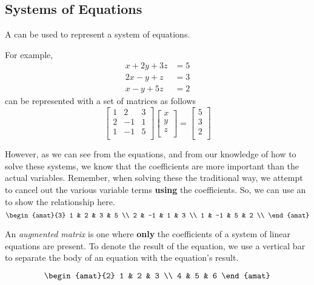 \subsection{Systems of Equations}\label{subsec:Systems_Equations}
A  can be used to represent a system of equations.

For example,
\begin{align*}
  x + 2y + 3z &= 5 \\
  2x - y + z &= 3 \\
  x - y + 5z &= 2
\end{align*}
can be represented with a set of matrices as follows
\begin{equation*}
  \begin{bmatrix}
    1 & 2 & 3 \\
    2 & -1 & 1 \\
    1 & -1 & 5 \\
  \end{bmatrix}
  \begin{bmatrix}
    x \\
    y \\
    z \\
  \end{bmatrix}
  =
  \begin{bmatrix}
    5 \\
    3 \\
    2 \\
  \end{bmatrix}
\end{equation*}

However, as we can see from the equations, and from our knowledge of how to solve these systems, we know that the coefficients are more important than the actual variables.
Remember, when solving these the traditional way, we attempt to cancel out the various variable terms \textbf{using} the coefficients.
So, we can use an  to show the relationship here.
\begin{equation*}
  \begin{amat}{3}
    1 & 2 & 3 & 5 \\
    2 & -1 & 1 & 3 \\
    1 & -1 & 5 & 2 \\
  \end{amat}
\end{equation*}

\begin{definition}\label{def:Augmented_Matrix}
  An \emph{augmented matrix} is one where \textbf{only} the coefficients of a system of linear equations are present.
  To denote the result of the equation, we use a vertical bar to separate the body of an equation with the equation's result.

  \begin{equation}\label{eq:Augmented_Matrix}
    \begin{amat}{2}
      1 & 2 & 3 \\
      4 & 5 & 6
    \end{amat}
  \end{equation}
\end{definition}

